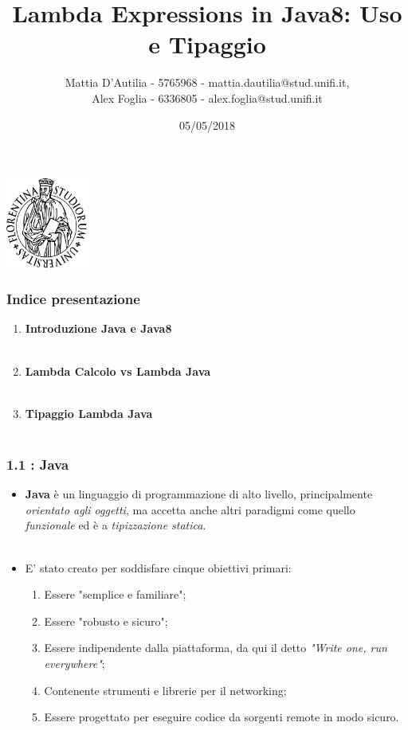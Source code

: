 \documentclass{beamer}
\title[Lambda in Java8]{Lambda Expressions in Java8: Uso e Tipaggio}
\author[]{Mattia D'Autilia - 5765968 - mattia.dautilia@stud.unifi.it,\\ Alex Foglia - 6336805 - alex.foglia@stud.unifi.it}
\date{05/05/2018}
\begin{document}
\begin{frame}
	\begin{center}
  		\includegraphics[width=0.2\textwidth]{assets/logo-unifi.png}
  	\end{center}
	\titlepage 
\end{frame}

\begin{frame}
	\frametitle{Indice presentazione}
	\begin{enumerate}
		\item
			\textbf{Introduzione Java e Java8}\\\
		\item
			\textbf{Lambda Calcolo vs Lambda Java}\\\
		\item
			\textbf{Tipaggio Lambda Java}\\\
	\end{enumerate}
\end{frame}


\begin{frame}
	\frametitle{\textbf{1.1 : Java}}
	\begin{itemize}
		\item
			\textbf{Java} è un linguaggio di programmazione di alto livello, principalmente \textit{orientato agli oggetti}, ma accetta anche altri paradigmi come quello \textit{funzionale} ed è a \textit{tipizzazione statica}.\\\
		\item
			E' stato creato per soddisfare cinque obiettivi primari:
			\begin{enumerate}
				\item
					Essere "semplice e familiare";
				\item
					Essere "robusto e sicuro";
				\item
					Essere indipendente dalla piattaforma, da qui il detto \textit{"Write one, run everywhere"};
				\item
					Contenente strumenti e librerie per il networking;
				\item
					Essere progettato per eseguire codice da sorgenti remote in modo sicuro.
			\end{enumerate}
	\end{itemize}
\end{frame}
\end{document}
